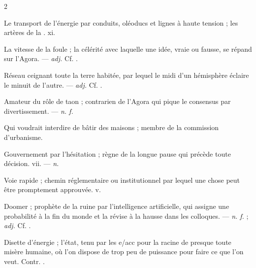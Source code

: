 \begin{multicols}{2}

 Le transport de l'énergie par conduits, oléoducs et lignes à haute tension ; les artères de la .   xi.

 La vitesse de la foule ; la célérité avec laquelle une idée, vraie ou fausse, se répand sur l'Agora. —  \textit{adj.} Cf. .

 Réseau ceignant toute la terre habitée, par lequel le midi d'un hémisphère éclaire le minuit de l'autre. —  \textit{adj.} Cf. .

 Amateur du rôle de taon ; contrarien de l'Agora qui pique le consensus par divertissement. —  \textit{n. f.}

  Qui voudrait interdire de bâtir des maisons ; membre de la commission d'urbanisme.

 Gouvernement par l'hésitation ; règne de la longue pause qui précède toute décision.   vii. —  \textit{n.}

 Voie rapide ; chemin réglementaire ou institutionnel par lequel une chose peut être promptement approuvée.   v.

 Doomer ; prophète de la ruine par l'intelligence artificielle, qui assigne une probabilité à la fin du monde et la révise à la hausse dans les colloques. —  \textit{n. f.} ;  \textit{adj.} Cf. .

 Disette d'énergie ; l'état, tenu par les e/acc pour la racine de presque toute misère humaine, où l'on dispose de trop peu de puissance pour faire ce que l'on veut. Contr. .


\end{multicols}
